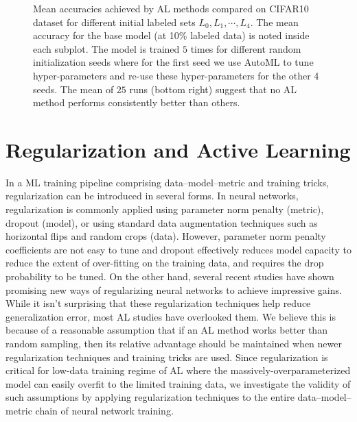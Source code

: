 \documentclass[10pt,twocolumn,letterpaper]{article}
\begin{document}
\begin{figure*}[t]
\begin{center}
  \vspace{-2em}
\end{center}
    \caption{Mean accuracies achieved by AL methods compared on CIFAR10 dataset for different initial labeled sets $L_{0}, L_{1}, \cdots, L_{4}$. The mean accuracy for the base model (at 10\% labeled data) is noted inside each subplot. The model is trained $5$ times for different random initialization seeds where for the first seed we use AutoML to tune hyper-parameters and re-use these hyper-parameters for the other 4 seeds. The mean of $25$ runs (bottom right) suggest that no AL method performs consistently better than others.}
    
\label{fig:cifar_five_lSets_stats_cif10}
  \vspace{-1em}
\end{figure*}

\section{Regularization and Active Learning}\label{sec:regularization_section}
In a ML training pipeline comprising data--model--metric and training tricks, regularization can be introduced in several forms. In neural networks, regularization is commonly applied using parameter norm penalty (metric), dropout (model), or using standard data augmentation techniques such as horizontal flips and random crops (data). However, parameter norm penalty coefficients are not easy to tune and dropout effectively reduces model capacity to reduce the extent of over-fitting on the training data, and requires the drop probability to be tuned. On the other hand, several recent studies have shown promising new ways of regularizing neural networks to achieve impressive gains. While it isn't surprising that these regularization techniques help reduce generalization error, most AL studies have overlooked them. We believe this is because of a reasonable assumption that if an AL method works better than random sampling, then its relative advantage should be maintained when newer regularization techniques and training tricks are used. Since regularization is critical for low-data training regime of AL where the massively-overparameterized model can easily overfit to the limited training data, we investigate the validity of such assumptions by applying regularization techniques to the entire data--model--metric chain of neural network training.
\end{document}
